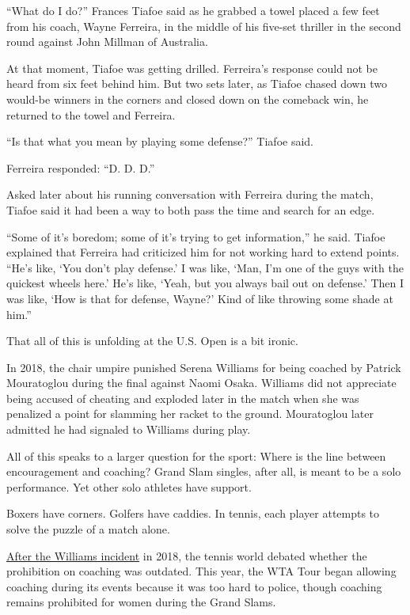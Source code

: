 ``What do I do?'' Frances Tiafoe said as he grabbed a towel placed a few
feet from his coach, Wayne Ferreira, in the middle of his five-set
thriller in the second round against John Millman of Australia.

At that moment, Tiafoe was getting drilled. Ferreira's response could
not be heard from six feet behind him. But two sets later, as Tiafoe
chased down two would-be winners in the corners and closed down on the
comeback win, he returned to the towel and Ferreira.

``Is that what you mean by playing some defense?'' Tiafoe said.

Ferreira responded: ``D. D. D.''

Asked later about his running conversation with Ferreira during the
match, Tiafoe said it had been a way to both pass the time and search
for an edge.

``Some of it's boredom; some of it's trying to get information,'' he
said. Tiafoe explained that Ferreira had criticized him for not working
hard to extend points. ``He's like, `You don't play defense.' I was
like, `Man, I'm one of the guys with the quickest wheels here.' He's
like, `Yeah, but you always bail out on defense.' Then I was like, `How
is that for defense, Wayne?' Kind of like throwing some shade at him.''

That all of this is unfolding at the U.S. Open is a bit ironic.

In 2018, the chair umpire punished Serena Williams for being coached by
Patrick Mouratoglou during the final against Naomi Osaka. Williams did
not appreciate being accused of cheating and exploded later in the match
when she was penalized a point for slamming her racket to the ground.
Mouratoglou later admitted he had signaled to Williams during play.

All of this speaks to a larger question for the sport: Where is the line
between encouragement and coaching? Grand Slam singles, after all, is
meant to be a solo performance. Yet other solo athletes have support.

Boxers have corners. Golfers have caddies. In tennis, each player
attempts to solve the puzzle of a match alone.

\href{https://www.nytimes3xbfgragh.onion/2019/08/23/sports/tennis/us-open-coaching-serena-williams.html}{After
the Williams incident} in 2018, the tennis world debated whether the
prohibition on coaching was outdated. This year, the WTA Tour began
allowing coaching during its events because it was too hard to police,
though coaching remains prohibited for women during the Grand Slams.

